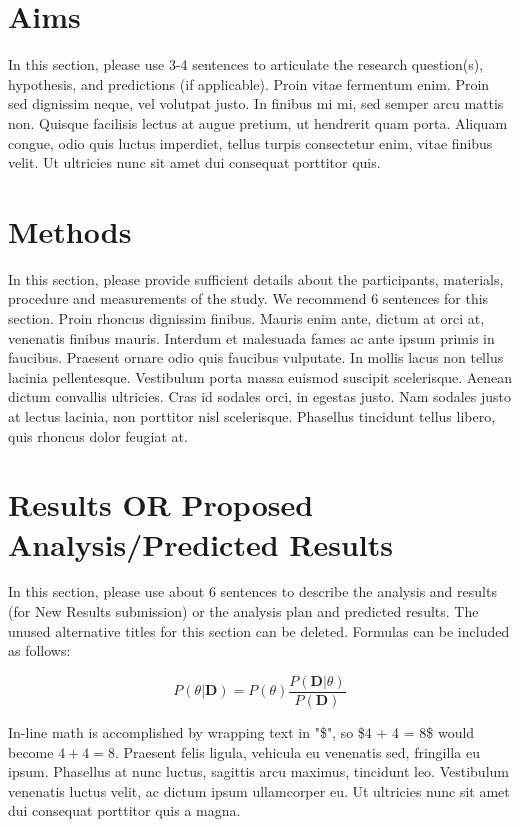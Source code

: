 \documentclass[10pt]{article}
\begin{document}
\begin{multicols}{2}
\section{Aims}
In this section, please use 3-4 sentences to articulate the research question(s), hypothesis, and predictions (if applicable). Proin vitae fermentum enim. Proin sed dignissim neque, vel volutpat justo. In finibus mi mi, sed semper arcu mattis non. Quisque facilisis lectus at augue pretium, ut hendrerit quam porta. Aliquam congue, odio quis luctus imperdiet, tellus turpis consectetur enim, vitae finibus velit. Ut ultricies nunc sit amet dui consequat porttitor quis.

\section{Methods}
In this section, please provide sufficient details about the participants, materials, procedure and measurements of the study. We recommend 6 sentences for this section. Proin rhoncus dignissim finibus. Mauris enim ante, dictum at orci at, venenatis finibus mauris. Interdum et malesuada fames ac ante ipsum primis in faucibus. Praesent ornare odio quis faucibus vulputate. In mollis lacus non tellus lacinia pellentesque. Vestibulum porta massa euismod suscipit scelerisque. Aenean dictum convallis ultricies. Cras id sodales orci, in egestas justo. Nam sodales justo at lectus lacinia, non porttitor nisl scelerisque. Phasellus tincidunt tellus libero, quis rhoncus dolor feugiat at. 

\section{Results OR Proposed Analysis/Predicted Results}
In this section, please use about 6 sentences to describe the analysis and results (for New Results submission) or the analysis plan and predicted results. The unused alternative titles for this section can be deleted. Formulas can be included as follows:

\begin{equation}
        \label{eq:bayes}
        P(\theta|\textbf{D}) = P(\theta ) \frac{P(\textbf{D} |\theta)}{P(\textbf{D})}
\end{equation}

In-line math is accomplished by wrapping text in "\$", so \$4 + 4  = 8\$ would become $4+4 = 8$.
Praesent felis ligula, vehicula eu venenatis sed, fringilla eu ipsum. Phasellus at nunc luctus, sagittis arcu maximus, tincidunt leo. Vestibulum venenatis luctus velit, ac dictum ipsum ullamcorper eu. Ut ultricies nunc sit amet dui consequat porttitor quis a magna.


\end{multicols}
\end{document}
